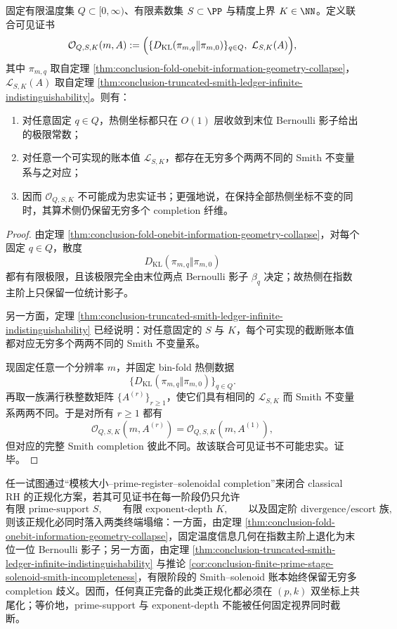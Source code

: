 \begin{theorem}\label{thm:conclusion-joint-thermal-smith-nonfaithfulness}
固定有限温度集 \(Q\subset[0,\infty)\)、有限素数集 \(S\subset\PP\) 与精度上界 \(K\in\NN\)。定义联合可见证书
\[
\mathcal O_{Q,S,K}(m,A)
:=
\Bigl(
\{D_{\mathrm{KL}}(\pi_{m,q}\Vert \pi_{m,0})\}_{q\in Q},
\ \mathcal L_{S,K}(A)
\Bigr),
\]
其中 \(\pi_{m,q}\) 取自定理 \ref{thm:conclusion-fold-onebit-information-geometry-collapse}，\(\mathcal L_{S,K}(A)\) 取自定理 \ref{thm:conclusion-truncated-smith-ledger-infinite-indistinguishability}。则有：
\begin{enumerate}
  \item 对任意固定 \(q\in Q\)，热侧坐标都只在 \(O(1)\) 层收敛到末位 Bernoulli 影子给出的极限常数；
  \item 对任意一个可实现的账本值 \(\mathcal L_{S,K}\)，都存在无穷多个两两不同的 Smith 不变量系与之对应；
  \item 因而 \(\mathcal O_{Q,S,K}\) 不可能成为忠实证书；更强地说，在保持全部热侧坐标不变的同时，其算术侧仍保留无穷多个 completion 纤维。
\end{enumerate}
\end{theorem}
\begin{proof}
由定理 \ref{thm:conclusion-fold-onebit-information-geometry-collapse}，对每个固定 \(q\in Q\)，散度
\[
D_{\mathrm{KL}}(\pi_{m,q}\Vert \pi_{m,0})
\]
都有有限极限，且该极限完全由末位两点 Bernoulli 影子 \(\beta_q\) 决定；故热侧在指数主阶上只保留一位统计影子。

另一方面，定理 \ref{thm:conclusion-truncated-smith-ledger-infinite-indistinguishability} 已经说明：对任意固定的 \(S\) 与 \(K\)，每个可实现的截断账本值都对应无穷多个两两不同的 Smith 不变量系。

现固定任意一个分辨率 \(m\)，并固定 bin-fold 热侧数据
\[
\{D_{\mathrm{KL}}(\pi_{m,q}\Vert \pi_{m,0})\}_{q\in Q}.
\]
再取一族满行秩整数矩阵 \(\{A^{(r)}\}_{r\ge 1}\)，使它们具有相同的 \(\mathcal L_{S,K}\) 而 Smith 不变量系两两不同。于是对所有 \(r\ge 1\) 都有
\[
\mathcal O_{Q,S,K}(m,A^{(r)})
=
\mathcal O_{Q,S,K}(m,A^{(1)}),
\]
但对应的完整 Smith completion 彼此不同。故该联合可见证书不可能忠实。证毕。
\end{proof}

\begin{conjecture}\label{conj:conclusion-smith-solenoid-cofinal-normalization}
任一试图通过“模核大小--prime-register--solenoidal completion”来闭合 classical RH 的正规化方案，若其可见证书在每一阶段仍只允许
\[
\text{有限 prime-support }S,
\qquad
\text{有限 exponent-depth }K,
\qquad
\text{以及固定阶 divergence/escort 族},
\]
则该正规化必同时落入两类终端塌缩：一方面，由定理 \ref{thm:conclusion-fold-onebit-information-geometry-collapse}，固定温度信息几何在指数主阶上退化为末位一位 Bernoulli 影子；另一方面，由定理 \ref{thm:conclusion-truncated-smith-ledger-infinite-indistinguishability} 与推论 \ref{cor:conclusion-finite-prime-stage-solenoid-smith-incompleteness}，有限阶段的 Smith--solenoid 账本始终保留无穷多 completion 歧义。因而，任何真正完备的此类正规化都必须在 \((p,k)\) 双坐标上共尾化；等价地，prime-support 与 exponent-depth 不能被任何固定视界同时截断。
\end{conjecture}


